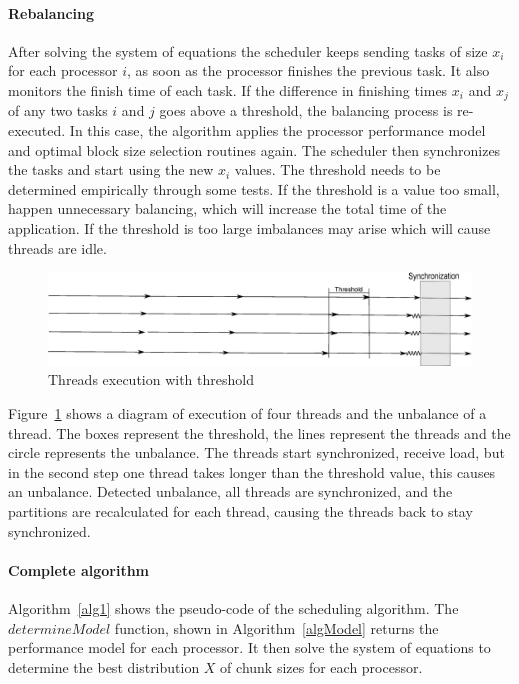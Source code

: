 \documentclass[journal]{IEEEtran}
\begin{document}
\paragraph*{Rebalancing} After solving the system of equations the scheduler keeps
sending tasks of size $x_i$ for each processor $i$, as soon as the processor
finishes the previous task. It also monitors the finish time of each task. If
the difference in finishing times $x_i$ and $x_j$ of any two tasks $i$ and $j$
goes above a threshold, the balancing process is re-executed. In this case, the
algorithm applies the processor performance model and optimal block size
selection routines again. The scheduler then synchronizes the tasks and start
using the new $x_i$ values. The threshold needs to be determined empirically through some tests. If the threshold is a value too small, happen unnecessary balancing, which will increase the total time of the application. If the threshold is too large imbalances may arise which will cause threads are idle.

\begin{figure}[!t]
	\centering
			\includegraphics[scale=0.24]{DiagramaArtigo.eps}
	\caption{Threads execution with threshold}
	\label{fig:Diagrama}
\end{figure}

Figure~\ref{fig:Diagrama} shows a diagram of execution of four threads and the unbalance of a thread. The boxes represent the threshold, the lines represent the threads and the circle represents the unbalance. The threads start synchronized, receive load, but in the second step one thread takes longer than the threshold value, this causes an unbalance. Detected unbalance, all threads are synchronized, and the partitions are recalculated for each thread, causing the threads back to stay synchronized. 


\vspace{0.2cm}
\paragraph*{Complete algorithm} Algorithm~\ref{alg1} shows the pseudo-code of 
the scheduling algorithm. The $determineModel$ function, shown in
Algorithm~\ref{algModel} returns the performance model for each processor. It
then solve the system of equations to determine the best distribution $X$ of
chunk sizes for each processor. 
\end{document}
